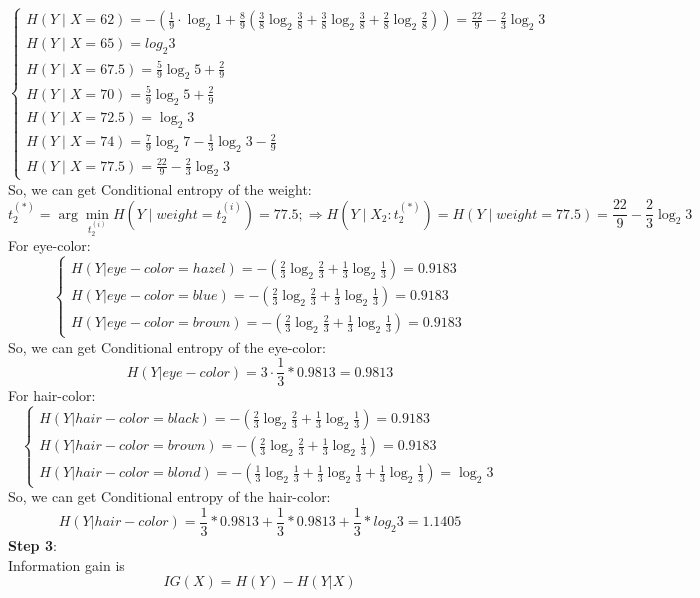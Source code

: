 \documentclass[onecolumn,oneside]{SUSTechHomework}
\begin{document}
    \[
        \begin{cases}
            H(Y \mid X=62) = -\left(\frac{1}{9}\cdot \log_2 1 + \frac{8}{9}\left(\frac{3}{8} \log_2 \frac{3}{8} + \frac{3}{8} \log_2 \frac{3}{8} + \frac{2}{8} \log_2 \frac{2}{8}\right)\right)=\frac{22}{9} - \frac{2}{3} \log_2 3 \\
            H(Y \mid X=65) = log_2 3\\
            H(Y \mid X=67.5) = \frac{5}{9}\log_2 5 + \frac{2}{9} \\
            H(Y \mid X=70) = \frac{5}{9}\log_2 5 + \frac{2}{9} \\
            H(Y \mid X=72.5) = \log_2 3 \\
            H(Y \mid X = 74) = \frac{7}{9}\log_2 7 - \frac{1}{3}\log_2 3 - \frac{2}{9} \\
            H(Y \mid X = 77.5) = \frac{22}{9} - \frac{2}{3}\log_2 3
        \end{cases}
    \]
    So, we can get Conditional entropy of the weight:
    \[
        t_2^{(*)} = \arg\min_{t_2^{(i)}} H(Y \mid weight = t_2^{(i)}) = 77.5; \Rightarrow H(Y \mid X_2 : t_2^{(*)}) = H(Y \mid weight = 77.5) = \frac{22}{9} - \frac{2}{3} \log_2 3
    \]
    For eye-color:
    \[
    \begin{cases}
        H(Y|eye-color = hazel) = -(\frac{2}{3} \log_2 \frac{2}{3} + \frac{1}{3} \log_2 \frac{1}{3}) = 0.9183 \\
        H(Y|eye-color = blue) = -(\frac{2}{3} \log_2 \frac{2}{3} + \frac{1}{3} \log_2 \frac{1}{3}) = 0.9183 \\
        H(Y|eye-color = brown) = -(\frac{2}{3} \log_2 \frac{2}{3} + \frac{1}{3} \log_2 \frac{1}{3}) = 0.9183
    \end{cases}
    \]
    So, we can get Conditional entropy of the eye-color:
    \[
        H(Y|eye-color) = 3 \cdot \frac{1}{3}*0.9813 = 0.9813
    \]
    For hair-color:
    \[
    \begin{cases}
        H(Y|hair-color = black) = -(\frac{2}{3} \log_2 \frac{2}{3} + \frac{1}{3} \log_2 \frac{1}{3}) = 0.9183 \\
        H(Y|hair-color = brown) = -(\frac{2}{3} \log_2 \frac{2}{3} + \frac{1}{3} \log_2 \frac{1}{3}) = 0.9183 \\
        H(Y|hair-color = blond) = -(\frac{1}{3} \log_2 \frac{1}{3} + \frac{1}{3} \log_2 \frac{1}{3} + \frac{1}{3} \log_2 \frac{1}{3}) = \log_2 3
    \end{cases}
    \]
    So, we can get Conditional entropy of the hair-color:
    \[
        H(Y|hair-color) = \frac{1}{3}*0.9813 + \frac{1}{3}*0.9813 + \frac{1}{3}*log_2 3 = 1.1405
    \]
    \textbf{Step 3}: \\
    Information gain is 
    \[
    IG(X) = H(Y) - H(Y|X)
    \]
\end{document}
